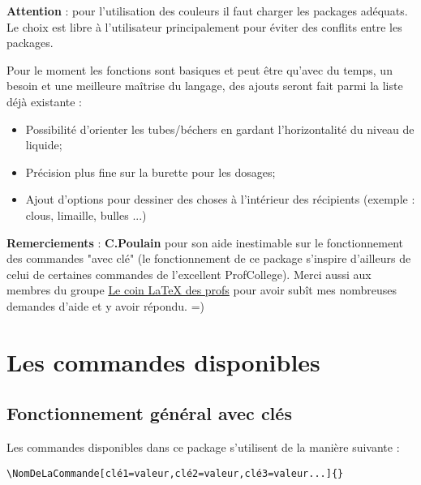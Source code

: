 \documentclass[a4paper,12pt,dvipsnames]{report}
\newcommand{\important}[1]{%
\vspace{0.5cm}

\begin{imp} 
#1 
\end{imp}
\vspace{0.5cm}%
}
\begin{document}
\important{\textbf{Attention} : pour l'utilisation des couleurs il faut charger les packages adéquats. Le choix est libre à l'utilisateur principalement pour éviter des conflits entre les packages.}

\vspace{1cm}

Pour le moment les fonctions sont basiques et peut être qu'avec du temps, un besoin et une meilleure maîtrise du langage, des ajouts seront fait parmi la liste déjà existante :
\begin{itemize}
\item Possibilité d'orienter les tubes/béchers en gardant l'horizontalité du niveau de liquide;
\item Précision plus fine sur la burette pour les dosages;
\item Ajout d'options pour dessiner des choses à l'intérieur des récipients (exemple : clous, limaille, bulles ...)
\end{itemize}

\vspace{1cm}

\textbf{Remerciements} : \textbf{C.Poulain} pour son aide inestimable sur le fonctionnement des commandes "avec clé" (le fonctionnement de ce package s'inspire d'ailleurs de celui de certaines commandes de l'excellent ProfCollege). Merci aussi aux membres du groupe \href{https://www.facebook.com/groups/442377419942175}{Le coin LaTeX des profs} pour avoir subît mes nombreuses demandes d'aide et y avoir répondu. =)
\chapter{Les commandes disponibles}
\thispagestyle{fancy}
\section{Fonctionnement général avec clés}

Les commandes disponibles dans ce package s'utilisent de la manière suivante : 

\vspace{2cm}

\begin{lstlisting}[style=A]
\NomDeLaCommande[clé1=valeur,clé2=valeur,clé3=valeur...]{}
\end{lstlisting}



\vspace{0.5cm}
\end{document}
